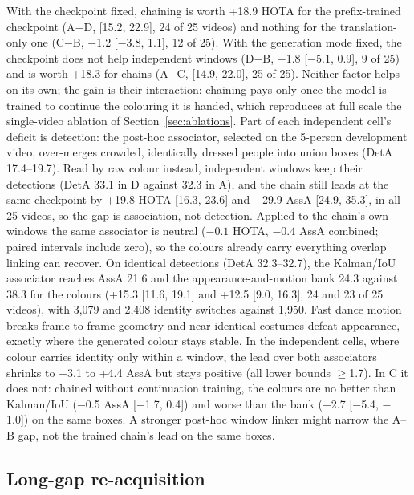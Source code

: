 \documentclass{article} %
\newcommand{\rev}[1]{{\color{blue}#1}}
\begin{document}
\rev{With the checkpoint fixed, chaining is worth +18.9 HOTA for the prefix-trained
checkpoint (A$-$D, [15.2, 22.9], 24 of 25 videos) and nothing for the translation-only one
(C$-$B, $-$1.2 [$-$3.8, 1.1], 12 of 25). With the generation mode fixed, the checkpoint
does not help independent windows (D$-$B, $-$1.8 [$-$5.1, 0.9], 9 of 25) and is worth +18.3
for chains (A$-$C, [14.9, 22.0], 25 of 25). Neither factor helps on its own; the gain is
their interaction: chaining pays only once the model is trained
to continue the colouring it is handed, which reproduces at full scale the single-video
ablation of Section~\ref{sec:ablations}. Part of each independent cell's deficit is detection: the post-hoc associator,
selected on the 5-person development video, over-merges crowded, identically dressed
people into union boxes (DetA 17.4--19.7). Read by raw colour instead, independent
windows keep their detections (DetA 33.1 in D against 32.3 in A), and the chain still leads
at the same checkpoint by +19.8 HOTA [16.3, 23.6] and +29.9 AssA [24.9, 35.3], in all 25
videos, so the gap is association, not detection.} Applied to the chain's own
windows the same associator is neutral ($-0.1$ HOTA, $-0.4$ AssA combined\rev{; paired
intervals include zero}), so the colours already
carry everything overlap linking can recover. On identical detections (DetA 32.3--32.7), the Kalman/IoU
associator reaches AssA 21.6 and the appearance-and-motion bank 24.3 against 38.3 for the
colours \rev{(+15.3 [11.6, 19.1] and +12.5 [9.0, 16.3], 24 and 23 of 25 videos)}, with
3,079 and 2,408 identity switches against 1,950. Fast dance motion breaks
frame-to-frame geometry and near-identical costumes defeat appearance, exactly where the
generated colour stays stable. \rev{In the independent cells, where colour
carries identity only within a window, the lead over both associators shrinks to +3.1 to
+4.4 AssA but stays positive (all lower bounds $\geq$1.7). In C it does not: chained without
continuation training, the colours are no better than Kalman/IoU ($-$0.5 AssA [$-$1.7, 0.4])
and worse than the bank ($-$2.7 [$-$5.4, $-$1.0]) on the same boxes.} A stronger post-hoc
\rev{window linker} might narrow the A--B gap\rev{, not the trained chain's lead on the same
boxes}.

\subsection{Long-gap re-acquisition}
\label{sec:reacq}
\end{document}
